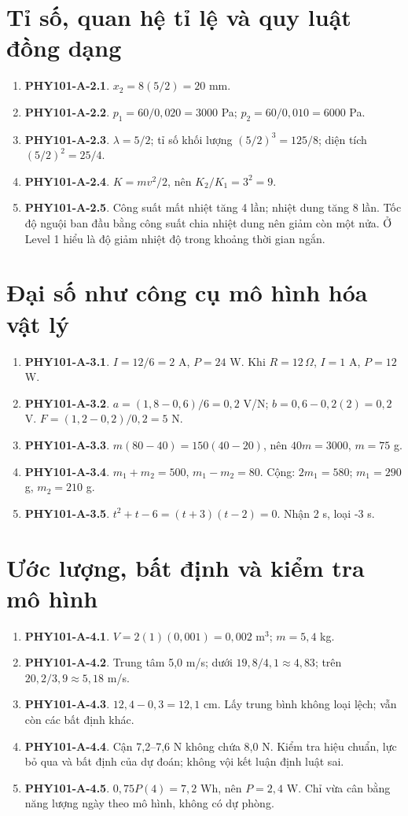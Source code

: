 \documentclass[11pt,a4paper,openany]{book}
\begin{document}
\section{Tỉ số, quan hệ tỉ lệ và quy luật đồng dạng}
\begin{enumerate}
\item \textbf{PHY101-A-2.1}. $x_2=8(5/2)=20$ mm.
\item \textbf{PHY101-A-2.2}. $p_1=60/0{,}020=3000$ Pa; $p_2=60/0{,}010=6000$ Pa.
\item \textbf{PHY101-A-2.3}. $\lambda=5/2$; tỉ số khối lượng $(5/2)^3=125/8$; diện tích $(5/2)^2=25/4$.
\item \textbf{PHY101-A-2.4}. $K=mv^2/2$, nên $K_2/K_1=3^2=9$.
\item \textbf{PHY101-A-2.5}. Công suất mất nhiệt tăng 4 lần; nhiệt dung tăng 8 lần. Tốc độ nguội ban đầu bằng công suất chia nhiệt dung nên giảm còn một nửa. Ở Level 1 hiểu là độ giảm nhiệt độ trong khoảng thời gian ngắn.
\end{enumerate}
\section{Đại số như công cụ mô hình hóa vật lý}
\begin{enumerate}
\item \textbf{PHY101-A-3.1}. $I=12/6=2$ A, $P=24$ W. Khi $R=12\,\Omega$, $I=1$ A, $P=12$ W.
\item \textbf{PHY101-A-3.2}. $a=(1{,}8-0{,}6)/6=0{,}2$ V/N; $b=0{,}6-0{,}2(2)=0{,}2$ V. $F=(1{,}2-0{,}2)/0{,}2=5$ N.
\item \textbf{PHY101-A-3.3}. $m(80-40)=150(40-20)$, nên $40m=3000$, $m=75$ g.
\item \textbf{PHY101-A-3.4}. $m_1+m_2=500$, $m_1-m_2=80$. Cộng: $2m_1=580$; $m_1=290$ g, $m_2=210$ g.
\item \textbf{PHY101-A-3.5}. $t^2+t-6=(t+3)(t-2)=0$. Nhận 2 s, loại -3 s.
\end{enumerate}
\section{Ước lượng, bất định và kiểm tra mô hình}
\begin{enumerate}
\item \textbf{PHY101-A-4.1}. $V=2(1)(0{,}001)=0{,}002$ m$^3$; $m=5{,}4$ kg.
\item \textbf{PHY101-A-4.2}. Trung tâm 5,0 m/s; dưới $19{,}8/4{,}1\approx4{,}83$; trên $20{,}2/3{,}9\approx5{,}18$ m/s.
\item \textbf{PHY101-A-4.3}. $12{,}4-0{,}3=12{,}1$ cm. Lấy trung bình không loại lệch; vẫn còn các bất định khác.
\item \textbf{PHY101-A-4.4}. Cận 7,2–7,6 N không chứa 8,0 N. Kiểm tra hiệu chuẩn, lực bỏ qua và bất định của dự đoán; không vội kết luận định luật sai.
\item \textbf{PHY101-A-4.5}. $0{,}75P(4)=7{,}2$ Wh, nên $P=2{,}4$ W. Chỉ vừa cân bằng năng lượng ngày theo mô hình, không có dự phòng.
\end{enumerate}
\end{document}
